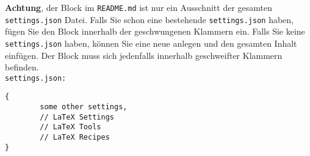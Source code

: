 \textbf{Achtung}, der Block im \verb|README.md| ist nur ein Ausschnitt der gesamten \verb|settings.json| Datei. 
Falls Sie schon eine bestehende \verb|settings.json| haben, fügen Sie den Block innerhalb der geschwungenen Klammern ein.
Falls Sie keine \verb|settings.json| haben, können Sie eine neue anlegen und den gesamten Inhalt einfügen. 
Der Block muss sich jedenfalls innerhalb geschweifter Klammern befinden.\\

\noindent\verb|settings.json:|
\begin{verbatim}
{
        some other settings,
        // LaTeX Settings
        // LaTeX Tools
        // LaTeX Recipes
}
\end{verbatim}